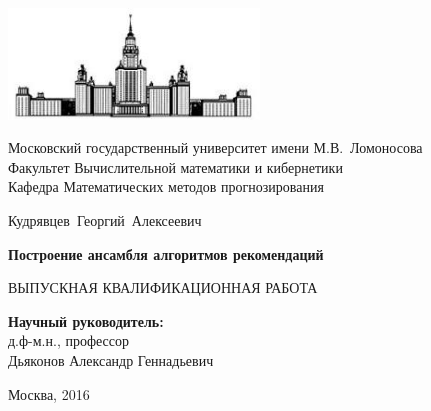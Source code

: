 \documentclass[14pt]{extarticle}
\begin{document}
\begingroup
\fontsize{12pt}{12pt}\selectfont
\begin{titlepage}
\begin{center}
 
 
   \includegraphics[width=0.5\textwidth]{titul_cartoon}
   
   Московский государственный университет имени М.В.~Ломоносова\\
   Факультет Вычислительной математики и кибернетики\\
   Кафедра Математических методов прогнозирования
   
    \vspace{5cm}
    {\Large Кудрявцев~Георгий~Алексеевич}  
    \vspace{1cm}
   
    {\Large\bfseries
    Построение ансамбля алгоритмов рекомендаций\\}
   
    \vspace{1cm}
   
    {\large ВЫПУСКНАЯ КВАЛИФИКАЦИОННАЯ РАБОТА}
 
    \vfill
   
    \begin{flushright}
      \textbf{Научный руководитель:}\\
      д.ф-м.н., профессор\\
      Дьяконов Александр Геннадьевич
    \end{flushright}
 
   \vspace{\fill}
   Москва, 2016
\end{center}
\end{titlepage}
\endgroup

\newpage
\end{document}

